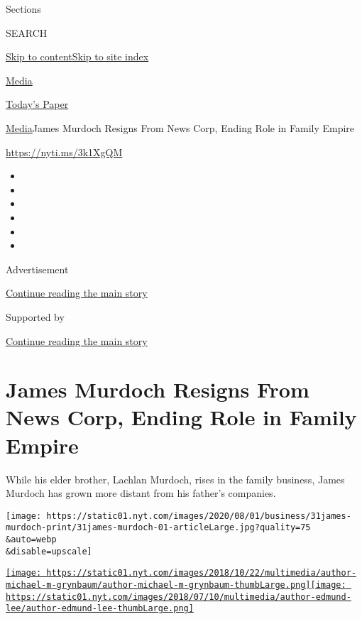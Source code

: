 Sections

SEARCH

\protect\hyperlink{site-content}{Skip to
content}\protect\hyperlink{site-index}{Skip to site index}

\href{https://www.nytimes.com/section/business/media}{Media}

\href{https://myaccount.nytimes.com/auth/login?response_type=cookie\&client_id=vi}{}

\href{https://www.nytimes.com/section/todayspaper}{Today's Paper}

\href{/section/business/media}{Media}\textbar{}James Murdoch Resigns
From News Corp, Ending Role in Family Empire

\url{https://nyti.ms/3k1XgQM}

\begin{itemize}
\item
\item
\item
\item
\item
\item
\end{itemize}

Advertisement

\protect\hyperlink{after-top}{Continue reading the main story}

Supported by

\protect\hyperlink{after-sponsor}{Continue reading the main story}

\hypertarget{james-murdoch-resigns-from-news-corp-ending-role-in-family-empire}{%
\section{James Murdoch Resigns From News Corp, Ending Role in Family
Empire}\label{james-murdoch-resigns-from-news-corp-ending-role-in-family-empire}}

While his elder brother, Lachlan Murdoch, rises in the family business,
James Murdoch has grown more distant from his father's companies.

\texttt{[image: https://static01.nyt.com/images/2020/08/01/business/31james-murdoch-print/31james-murdoch-01-articleLarge.jpg?quality=75\\\&auto=webp\\\&disable=upscale]}

\href{https://www.nytimes.com/by/michael-m-grynbaum}{\texttt{[image: https://static01.nyt.com/images/2018/10/22/multimedia/author-michael-m-grynbaum/author-michael-m-grynbaum-thumbLarge.png]}}\href{https://www.nytimes.com/by/edmund-lee}{\texttt{[image: https://static01.nyt.com/images/2018/07/10/multimedia/author-edmund-lee/author-edmund-lee-thumbLarge.png]}}

